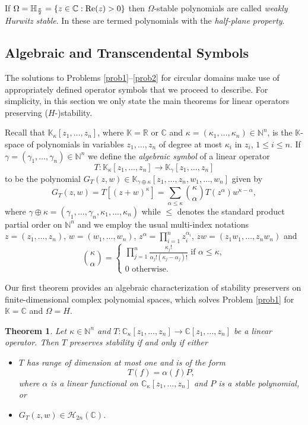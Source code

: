 \documentclass[10pt,reqno]{amsart}
\theoremstyle{plain}
\newtheorem{theorem}{Theorem}[section]
\theoremstyle{definition}
\theoremstyle{remark}
\numberwithin{equation}{section}
\newcommand{\NN}{\mathbb{N}}
\newcommand{\bH}{\mathbb{H}}
\newcommand{\HH}{\mathcal{H}}
\newcommand{\RR}{\mathbb{R}}
\newcommand{\CC}{\mathbb{C}}
\newcommand{\KK}{\mathbb{K}}
\newcommand{\al}{\alpha}
\renewcommand{\Re}{{\rm Re}}
\begin{document}
If $\Omega = \bH_{\frac{\pi}{2}}=\{z \in \CC : \Re(z) >0\}$ 
then $\Omega$-stable polynomials are called {\em weakly Hurwitz stable}. In 
\cite{COSW} these are termed polynomials with the {\em half-plane 
property}. 

\subsection{Algebraic and Transcendental Symbols}\label{new-ss-not}

The solutions to Problems \ref{prob1}--\ref{prob2} for circular domains make 
use of appropriately defined operator symbols that we proceed to describe. 
For simplicity, in this section we only state the main theorems for linear 
operators preserving ($H$-)stability. 

Recall that $\KK_\kappa[z_1,\ldots, z_n]$, where $\KK=\RR$ or $\CC$ and 
$\kappa=(\kappa_1,\ldots,\kappa_n) \in \NN^n$, 
is the $\KK$-space of polynomials in variables $z_1,\ldots,z_n$ of 
degree at most $\kappa_i$ in $z_i$, $1\le i\le n$. If  
$\gamma=(\gamma_1,\ldots,\gamma_n)\in\NN^n$ we define the 
{\em algebraic symbol} of a linear operator 
$$
T: \KK_\kappa[z_1,\ldots, z_n] \rightarrow  \KK_\gamma [z_1,\ldots, z_n]$$
to be the polynomial 
$G_T(z,w) \in \KK_{\gamma \oplus \kappa}[z_1,\ldots, z_n, w_1,\ldots, w_n]$ 
given by 
$$
G_T(z,w)= T[(z+w)^\kappa]
= \sum_{\alpha \leq \kappa}\binom \kappa \alpha T(z^\alpha)w^{\kappa-\alpha}, 
$$
where $\gamma \oplus \kappa = (\gamma_1,\ldots, \gamma_n, \kappa_1, \ldots, 
\kappa_n)$ while $\leq$ denotes the standard product partial order on $\NN^n$ 
and we employ the usual multi-index notations $z=(z_1,\ldots, z_n)$, 
$w=(w_1,\ldots, w_n)$, $z^{\al}=\prod_{i=1}^{n}z_i^{\al_i}$, 
$zw=(z_1w_1,\ldots,z_nw_n)$ and 
$$
\binom \kappa \alpha = \begin{cases}
\prod_{j=1}^n \frac{\kappa_j!}{\alpha_j!(\kappa_j-\alpha_j)!} \mbox{ if } 
\alpha \leq \kappa, \\
0 \mbox{ otherwise}. 
\end{cases}
$$

Our first theorem provides an algebraic characterization of stability 
preservers on finite-dimensional complex polynomial spaces, which solves 
Problem \ref{prob1} for $\KK=\CC$ and $\Omega=H$.

\begin{theorem}\label{multi-finite-stab}
Let $\kappa \in \NN^n$ and $T : \CC_\kappa[z_1,\ldots, z_n] \rightarrow 
\CC[z_1,\ldots, z_n]$ be a linear operator. Then $T$ preserves stability 
if and only if either
\begin{itemize}
\item[(a)] $T$ has range of dimension at most one and is of the form 
$$
T(f) = \alpha(f)P,
$$
where $\alpha$ is a linear functional on $\CC_\kappa[z_1,\ldots, z_n]$ and 
$P$ is a stable polynomial, or 
\item[(b)] $G_T(z,w)\in \HH_{2n}(\CC)$. 
\end{itemize}
\end{theorem}
\end{document}
